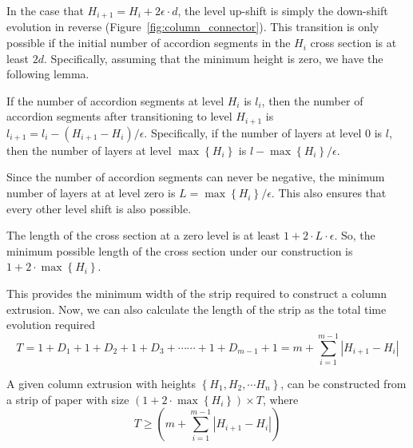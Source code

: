 In the case that $H_{i+1} = H_i+2\epsilon\cdot d$, the level up-shift is simply the down-shift evolution in reverse (Figure~\ref{fig:column_connector}).
This transition is only possible if the initial number of accordion segments in the $H_i$ cross section is at least $2d$.
Specifically, assuming that the minimum height is zero, we have the following lemma.
\begin{lemma}
\label{lem:layer_change}
If the number of accordion segments at level $H_i$ is $l_i$,
then the number of accordion segments after transitioning to level $H_{i+1}$ is $l_{i+1} = l_i - (H_{i+1}-H_i)/\epsilon$.
Specifically, if the number of layers at level $0$ is $l$, then the number of layers
at level $\max\left\{ H_i\right\}$ is $l - \max\left\{ H_i\right\}/\epsilon$.
\end{lemma}
\begin{corollary}
\label{cor:layer_limit}
Since the number of accordion segments can never be negative, the minimum number of layers at at level zero
is $L = \max\left\{ H_i\right\}/\epsilon$. This also ensures that every other level shift is also possible.
\end{corollary}
\begin{corollary}
\label{cor:column_cross_section_length}
The length of the cross section at a zero level is at least $1 + 2\cdot L\cdot \epsilon$.
So, the minimum possible length of the cross section under our construction is $1 + 2\cdot\max\left\{ H_i\right\}$.
\end{corollary}

This provides the minimum width of the strip required to construct a column extrusion.
Now, we can also calculate the length of the strip as the total time evolution required
$$ T = 1 + D_1  +  1 + D_2  +  1 + D_3  +\cdots\cdots +  1 + D_{m-1}  +  1 = m + \sum^{m-1}_{i=1} \left| H_{i+1}-H_i\right| $$

\begin{theorem}
\label{thm:column_extrusion}
A given column extrusion with heights $\left\{ H_1, H_2,\cdots H_n \right\}$, can be constructed from a strip of paper with size
$\left( 1 + 2\cdot\max\left\{ H_i\right\}\right)\times T$, where
$$T \ge \left( m + \sum\limits^{m-1}_{i=1} \left| H_{i+1}-H_i\right|\right)$$
\end{theorem}



